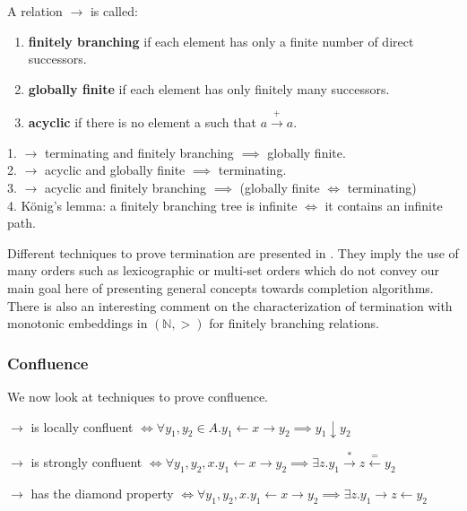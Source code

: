 \begin{definition}
A relation $\to$ is called:

\begin{enumerate}
\item \textbf{finitely branching} if each element has only a finite number of direct successors.
\item \textbf{globally finite} if each element has only finitely many successors.
\item \textbf{acyclic} if there is no element a such that $a \stackrel{+}{\rightarrow} a$. 
\end{enumerate}
\end{definition} 

\begin{proposition}
1. $\to$ terminating and finitely branching $\implies$ globally finite. \\
2. $\to$ acyclic and globally finite $\implies$ terminating. \\
3. $\to$ acyclic and finitely branching $\implies$ (globally finite $\iff$ terminating) \\
4. K\"onig's lemma: a finitely branching tree is infinite $\iff$ it contains an infinite path.
\end{proposition}

Different techniques to prove termination are presented in \cite{term-rewriting}. They imply the use of many orders such as lexicographic or multi-set orders which do not convey our main goal here of presenting general concepts towards completion algorithms. There is also an interesting comment on the characterization of termination with monotonic embeddings in $(\mathbb{N},>)$ for finitely branching relations.

\subsubsection{Confluence}

We now look at techniques to prove confluence. 

\begin{definition}
$\to$ is locally confluent $\iff \forall y_1,y_2 \in A. y_1 \gets x \to y_2 \implies y_1 \downarrow y_2$

$\to$ is strongly confluent $\iff \forall y_1,y_2,x.y_1 \gets x \to y_2 \implies \exists z.y_1 \stackrel{*}{\to} z \stackrel{=}{\gets} y_2$

$\to$ has the diamond property $\iff \forall y_1,y_2,x. y_1 \gets x \to y_2 \implies \exists z. y_1 \to z \gets y_2$
\end{definition}

